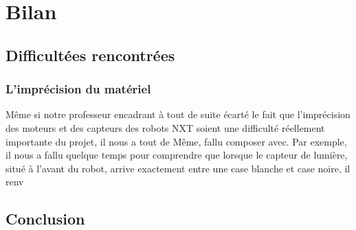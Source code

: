 \section{Bilan}

\subsection{Difficultées rencontrées}

\subsubsection{L'imprécision du matériel}

M\^{e}me si notre professeur encadrant à tout de suite écarté le fait que l'imprécision des moteurs et des capteurs des robots NXT soient une difficulté réellement importante du projet, il nous a tout de M\^{e}me, fallu composer avec. Par exemple, il nous a fallu quelque temps pour comprendre que lorsque le capteur de lumière, situé à l'avant du robot, arrive exactement entre une case blanche et case noire, il renv 


\subsection{Conclusion}